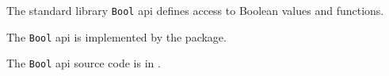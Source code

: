 
The standard library {\tt Bool} api defines access to Boolean values and functions.

The {\tt Bool} api is implemented by the  package.

The {\tt Bool} api source code is in .
